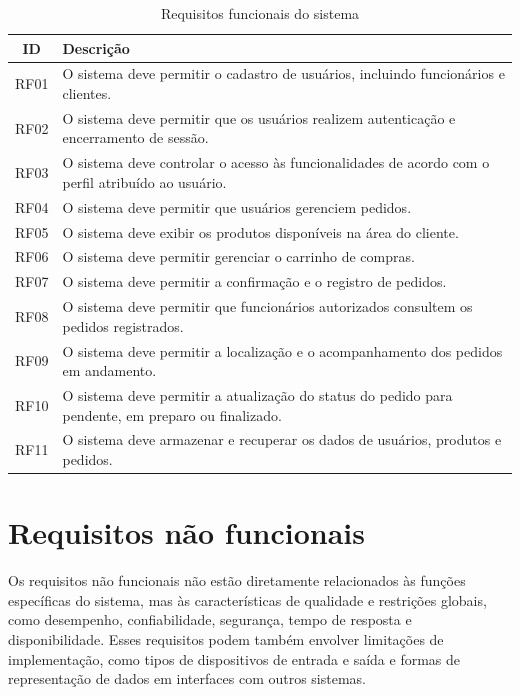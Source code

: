 \begin{table}[H]
\centering
\caption{Requisitos funcionais do sistema}
\label{tab:requisitos-funcionais}
\small

\begin{tabularx}{\textwidth}{c X}
\hline
\textbf{ID} & \textbf{Descrição} \\
\hline
RF01 & O sistema deve permitir o cadastro de usuários, incluindo funcionários e clientes. \\
\hline
RF02 & O sistema deve permitir que os usuários realizem autenticação e encerramento de sessão. \\
\hline
RF03 & O sistema deve controlar o acesso às funcionalidades de acordo com o perfil atribuído ao usuário. \\
\hline
RF04 & O sistema deve permitir que usuários gerenciem pedidos. \\
\hline
RF05 & O sistema deve exibir os produtos disponíveis na área do cliente. \\
\hline
RF06 & O sistema deve permitir gerenciar o carrinho de compras. \\
\hline
RF07 & O sistema deve permitir a confirmação e o registro de pedidos. \\
\hline
RF08 & O sistema deve permitir que funcionários autorizados consultem os pedidos registrados. \\
\hline
RF09 & O sistema deve permitir a localização e o acompanhamento dos pedidos em andamento. \\
\hline
RF10 & O sistema deve permitir a atualização do status do pedido para pendente, em preparo ou finalizado. \\
\hline
RF11 & O sistema deve armazenar e recuperar os dados de usuários, produtos e pedidos. \\
\hline
\end{tabularx}

\end{table}


\section{Requisitos não funcionais}

Os requisitos não funcionais não estão diretamente relacionados às funções específicas do sistema, mas às características de qualidade e restrições globais, como desempenho, confiabilidade, segurança, tempo de resposta e disponibilidade. Esses requisitos podem também envolver limitações de implementação, como tipos de dispositivos de entrada e saída e formas de representação de dados em interfaces com outros sistemas.

